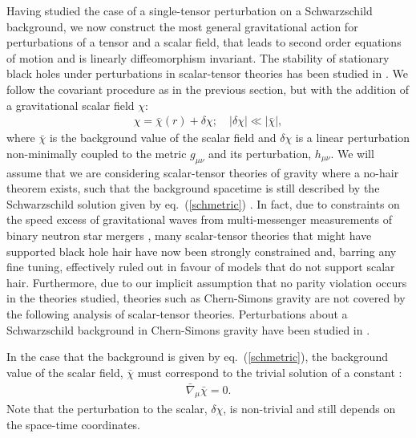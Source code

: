\documentclass[10pt,twocolumn,preprintnumbers,amsmath,amssymb,nofootinbib
,superscriptaddress]{revtex4-1}
\begin{document}
Having studied the case of a single-tensor perturbation on a Schwarzschild background, we now construct the most general gravitational action for perturbations of a tensor and a scalar field, that leads to second order equations of motion and is linearly diffeomorphism invariant. The stability of stationary black holes under perturbations in scalar-tensor theories has been studied in \cite{Ganguly:2017ort,Kobayashi:2012kh,Kobayashi:2014wsa}. We follow the covariant procedure as in the previous section, but with the addition of a gravitational scalar field $\chi$:
\begin{align}
 \chi=\bar{\chi}(r)+\delta\chi; \quad |\delta\chi|\ll |\bar{\chi}|,
\end{align}
where $\bar{\chi}$ is the background value of the scalar field and $\delta\chi$ is a linear perturbation non-minimally coupled to the metric $g_{\mu\nu}$ and its perturbation, $h_{\mu\nu}$. We will assume that we are considering scalar-tensor theories of gravity where a no-hair theorem exists, such that the background spacetime is still described by the Schwarzschild solution given by eq.~(\ref{schmetric}) \cite{2012PhRvL.108h1103S,Sotiriou:2013qea,Creminelli:2017sry}. In fact, due to constraints on the speed excess of gravitational waves \cite{Baker:2017hug,2017arXiv171005901M,2017arXiv171005893S} from multi-messenger measurements of binary neutron star mergers \cite{2017arXiv171005832T,2017arXiv171005834L,2017arXiv171005833L}, many scalar-tensor theories that might have supported black hole hair have now been strongly constrained and, barring any fine tuning, effectively ruled out in favour of models that do not support scalar hair. Furthermore, due to our implicit assumption that no parity violation occurs in the theories studied, theories such as Chern-Simons gravity \cite{Alexander:2009tp} are not covered by the following analysis of scalar-tensor theories. Perturbations about a Schwarzschild background in Chern-Simons gravity have been studied in \cite{Cardoso:2009pk,Molina:2010fb}.

In the case that the background is given by eq.~(\ref{schmetric}), the background value of the scalar field, $\bar{\chi}$ must correspond to the trivial solution of a constant \cite{2012PhRvL.108h1103S,Sotiriou:2013qea}:
\begin{align}
\bar{\nabla}_\mu\bar{\chi}=0.
\end{align}
Note that the perturbation to the scalar, $\delta\chi$, is non-trivial and still depends on the space-time coordinates. 
\end{document}
